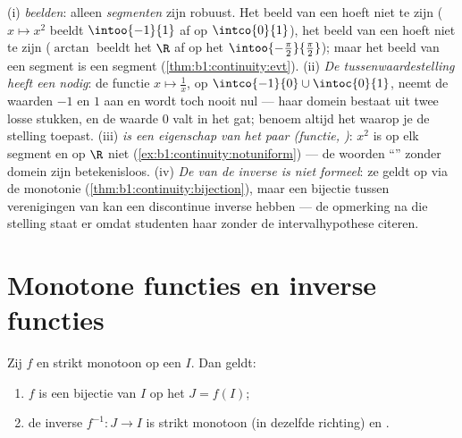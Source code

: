 \begin{remark}
(i) \emph{ beelden}: alleen \emph{segmenten} zijn robuust. Het
 beeld van een   hoeft niet  te zijn ($x \mapsto
x^2$ beeldt $\intoo{-1}{1}$ af op $\intco{0}{1}$), het beeld van een
 hoeft niet  te zijn ($\arctan$ beeldt het
 $\R$ af op het  $\intoo{-\frac\pi2}{\frac\pi2}$); maar het
beeld van een segment is een segment
(\cref{thm:b1:continuity:evt}). (ii) \emph{De tussenwaardestelling heeft
een  nodig}: de functie $x \mapsto \frac1x$,  op
$\intco{-1}{0} \cup \intoc{0}{1}$, neemt de waarden $-1$ en $1$ aan en
wordt toch nooit nul --- haar domein bestaat uit twee losse stukken, en
de waarde $0$ valt in het gat; benoem altijd het  waarop je de
stelling toepast. (iii) \emph{ is een eigenschap van
het paar (functie, )}: $x^2$ is op elk segment 
en op $\R$ niet (\cref{ex:b1:continuity:notuniform}) --- de woorden
``'' zonder domein zijn betekenisloos. (iv) \emph{De
 van de inverse is niet formeel}: ze geldt op  via
de monotonie (\cref{thm:b1:continuity:bijection}), maar een 
bijectie tussen verenigingen van  kan een discontinue inverse
hebben --- de opmerking na die stelling staat er omdat studenten haar
zonder de intervalhypothese citeren.
\end{remark}

\section{Monotone functies en inverse functies}

\begin{theorem}\label{thm:b1:continuity:bijection}
Zij $f$  en strikt monotoon op een  $I$. Dan geldt:
\begin{enumerate}
  \item $f$ is een bijectie van $I$ op het  $J = f(I)$;
  \item de inverse $f^{-1} \colon J \to I$ is strikt monotoon (in
        dezelfde richting) en \emph{}.
\end{enumerate}
\end{theorem}

